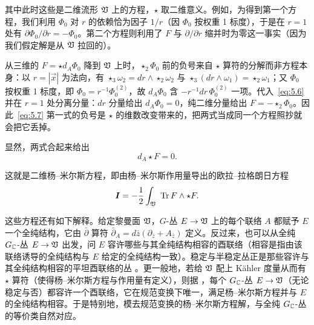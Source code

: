                   其中此时这些是二维流形 $\mathfrak{V}$ 上的方程，$\star$ 取二维意义。例如，为得到第一个方程，我们利用 $\Phi_0$ 对 $r$ 的依赖恰为因子 $1/r$（因 $\Phi_0$ 按权重 1 标度），于是在 $r=1$ 处有 $\partial\Phi_0/\partial r = -\Phi_0$。第二个方程则利用了 $F$ 与 $\partial/\partial r$ 缩并时为零这一事实（因为我们假定解是从 $\mathfrak{V}$ 拉回的）。

\begin{yizhu}[易错点]
从三维的 $F=\star d_A\Phi_0$ 降到 $\mathfrak{V}$ 上时，$\star_2\Phi_0$ 前的负号来自 $\star$ 算符的分解而非方程本身：以 $r=|\vec x|$ 为法向，有 $\star_3\omega_2=dr\wedge\star_2\omega_2$ 与 $\star_3(dr\wedge\omega_1)=\star_2\omega_1$；又 $\Phi_0$ 按权重 1 标度，即 $\Phi_0=r^{-1}\Phi_0^{(2)}$，故 $d_A\Phi_0$ 含 $-r^{-1}dr\,\Phi_0^{(2)}$ 一项。代入~\eqref{eq:5.6} 并在 $r=1$ 处分离分量：$dr$ 分量给出 $d_A\Phi_0=0$，纯二维分量给出 $F=-\star_2\Phi_0$。因此~\eqref{eq:5.7} 第一式的负号是 $\star$ 的维数改变带来的，把两式当成同一个方程照抄就会把它丢掉。
\end{yizhu}


显然，两式合起来给出
\setcounter{equation}{7}
\begin{equation}\label{eq:5.8}
  d_A\star F=0.
\end{equation}

这就是二维杨–米尔斯方程，即由杨–米尔斯作用量导出的欧拉–拉格朗日方程
\setcounter{equation}{8}
\begin{equation}\label{eq:5.9}
  {\bm{I}}=-{1\over
2}\int_{\mathfrak{V}}\,\,{\rm Tr} \,F\wedge \star F.
\end{equation}


这些方程还有如下解释。给定黎曼面 $\mathfrak{V}$，$G$-丛 $E\to
\mathfrak{V}$ 上的每个联络 $A$ 都赋予 $E$ 一个全纯结构，它由 $\bar\partial$ 算符 $\bar \partial_A=d\bar z(\partial_{\bar z}+A_{\bar
z})$ 定义。反过来，也可以从全纯
$G_{\mathbb{C}}$-丛 $E\to \mathfrak{V}$ 出发，问 $E$ 容许哪些与其全纯结构相容的酉联络（相容是指由该联络诱导的全纯结构与 $E$ 给定的全纯结构一致）。稳定与半稳定丛正是那些容许与其全纯结构相容的平坦酉联络的丛 \cite{ref51}。更一般地，若给 $\mathfrak{V}$ 配上 Kähler 度量从而有 $\star$ 算符（使得杨–米尔斯方程与作用量有定义），则据 \cite{ref52}，每个 $G_{\mathbb{C}}$-丛 $E\to \mathfrak{V}$（无论稳定与否）都容许一个酉联络，它在规范变换下唯一，满足杨–米尔斯方程并与 $E$ 的全纯结构相容。于是特别地，模去规范变换的杨–米尔斯方程解，与全纯 $G_{\mathbb{C}}$-丛的等价类自然对应。


